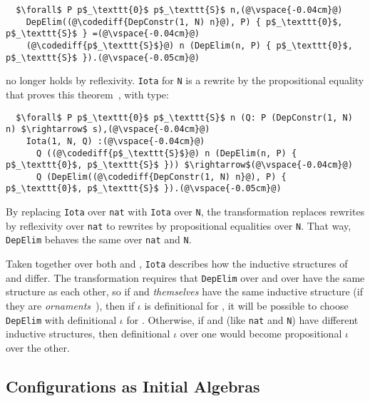 \begin{lstlisting}
  $\forall$ P p$_\texttt{0}$ p$_\texttt{S}$ n,(@\vspace{-0.04cm}@)
    DepElim((@\codediff{DepConstr(1, N) n}@), P) { p$_\texttt{0}$, p$_\texttt{S}$ } =(@\vspace{-0.04cm}@)
    (@\codediff{p$_\texttt{S}$}@) n (DepElim(n, P) { p$_\texttt{0}$, p$_\texttt{S}$ }).(@\vspace{-0.05cm}@)
\end{lstlisting}
no longer holds by reflexivity.
\lstinline{Iota} for \lstinline{N} is a rewrite by the propositional equality that proves this theorem~\href{https://github.com/uwplse/pumpkin-pi/blob/v2.0.0/plugin/coq/nonorn.v}{},
with type:

\begin{lstlisting}
  $\forall$ P p$_\texttt{0}$ p$_\texttt{S}$ n (Q: P (DepConstr(1, N) n) $\rightarrow$ s),(@\vspace{-0.04cm}@)
    Iota(1, N, Q) :(@\vspace{-0.04cm}@)
      Q ((@\codediff{p$_\texttt{S}$}@) n (DepElim(n, P) { p$_\texttt{0}$, p$_\texttt{S}$ })) $\rightarrow$(@\vspace{-0.04cm}@)
      Q (DepElim((@\codediff{DepConstr(1, N) n}@), P) { p$_\texttt{0}$, p$_\texttt{S}$ }).(@\vspace{-0.05cm}@)
\end{lstlisting}
By replacing \lstinline{Iota} over \lstinline{nat} with \lstinline{Iota} over \lstinline{N},
the transformation replaces rewrites by reflexivity over \lstinline{nat} to rewrites by propositional equalities over \lstinline{N}.
That way, \lstinline{DepElim} behaves the same over \lstinline{nat} and \lstinline{N}.

Taken together over both \Aa and \B, \lstinline{Iota} describes how the inductive structures of \Aa and \B differ.
The transformation requires that \lstinline{DepElim} over \Aa and over \B have the same structure
as each other, so if \Aa and \B \textit{themselves} have the same 
inductive structure (if they are \textit{ornaments}~\cite{mcbride}),
then if $\iota$ is definitional for \Aa, it will be possible to choose
\lstinline{DepElim} with definitional $\iota$ for \B.
Otherwise, if \Aa and \B (like \lstinline{nat} and \lstinline{N}) have different inductive structures,
then definitional $\iota$ over one would become propositional $\iota$ over the other.

\subsection{Configurations as Initial Algebras}
\label{sec:art}

